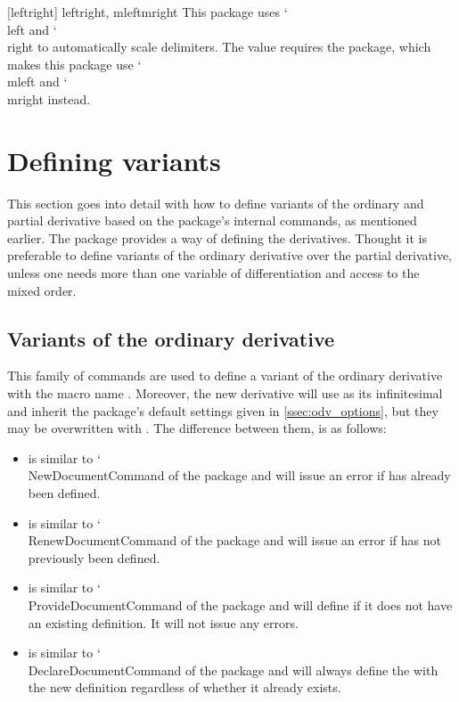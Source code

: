 \documentclass[final,british,10pt]{scrartcl}
\makeatletter
\theoremstyle{remark}
\DeclareRobustCommand\meta[1]{%
	\ensuremath\langle
	\ifmmode \expandafter \nfss@text \fi
	{%
		\meta@font@select
		\edef\meta@hyphen@restore
		{\hyphenchar\the\font\the\hyphenchar\font}%
		\hyphenchar\font\m@ne
		\language\l@nohyphenation
		#1\/%
		\meta@hyphen@restore
	}\ensuremath\rangle
}
\def\meta@font@select{\itshape}
\DeclareRobustCommand\cs[1]{{\CommonFont \char`\\#1}}
\providecommand\oarg[1]{%
	{\ttfamily[}\meta{#1}{\ttfamily]}}
\makeatother
\begin{document}
[leftright]{ leftright, mleftmright\req }
This package uses \cs{left} and \cs{right} to automatically scale delimiters. The value  requires the  package, which makes this package use \cs{mleft} and \cs{mright} instead.


\clearpage
\section{Defining variants} \label{sec:createvariants}
This section goes into detail with how to define variants of the ordinary and partial derivative based on the package's internal commands, as mentioned earlier. The \mypackage{} package provides a  way of defining the derivatives. Thought it is preferable to define variants of the ordinary derivative over the partial derivative, unless one needs more than one variable of differentiation and access to the mixed order.

\subsection{Variants of the ordinary derivative} \label{ssec:CreateOdvVariant}
\DescribeMacro*{\NewOdvVariant, \RenewOdvVariant, \ProvideOdvVariant, \DeclareOdvVariant}{\meta{control-sequence}, \meta{inf-d}, \oarg{key=value}}
This family of commands are used to define a variant of the ordinary derivative with the macro name . Moreover, the new derivative will use  as its infinitesimal and inherit the package's default settings given in \cref{ssec:odv_options}, but they may be overwritten with . The difference between them, is as follows:

\begin{itemize}
	\item {} is similar to \cs{NewDocumentCommand} of the  package and will issue an error if  has already been defined.
	\item {} is similar to \cs{RenewDocumentCommand} of the  package and will issue an error if  has not previously been defined.
	\item {} is similar to \cs{ProvideDocumentCommand} of the  package and will define  if it does not have an existing definition. It will not issue any errors.
	\item {} is similar to \cs{DeclareDocumentCommand} of the  package and will always define the  with the new definition regardless of whether it already exists.
\end{itemize}
\end{document}
